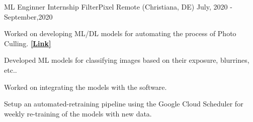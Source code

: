 

\begin{cventries}

 \cventry
    {ML Enginner Internship} %
    {FilterPixel} %
    {Remote (Christiana, DE)} %
    {July, 2020 - September,2020} %
   {
      \begin{cvitems} %
        \item {Worked on developing ML/DL models for automating the process of Photo Culling. {\href{https://filterpixel.com/}{\bf [Link]}}}
        \item {Developed ML models for classifying images based on their exposure, blurrines, etc..}
        \item{Worked on integrating the models with the software.}
        \item {Setup an automated-retraining pipeline using the Google Cloud Scheduler for weekly re-training of the models with new data.}
      \end{cvitems}
   }

\end{cventries}